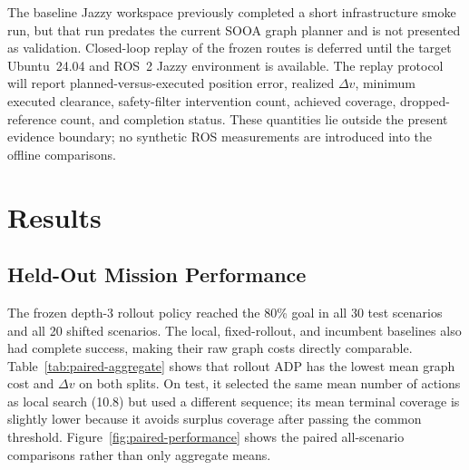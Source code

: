 \documentclass{IEEEtaes}
\theoremstyle{remark}
\theoremstyle{plain}
\begin{document}
The baseline Jazzy workspace previously completed a short infrastructure smoke run, but that run predates the current SOOA graph planner and is not presented as validation. Closed-loop replay of the frozen routes is deferred until the target Ubuntu~24.04 and ROS~2 Jazzy environment is available. The replay protocol will report planned-versus-executed position error, realized $\Delta v$, minimum executed clearance, safety-filter intervention count, achieved coverage, dropped-reference count, and completion status. These quantities lie outside the present evidence boundary; no synthetic ROS measurements are introduced into the offline comparisons.

\section{Results}
\label{sec:results}

\subsection{Held-Out Mission Performance}

The frozen depth-3 rollout policy reached the 80\% goal in all 30 test scenarios and all 20 shifted scenarios. The local, fixed-rollout, and incumbent baselines also had complete success, making their raw graph costs directly comparable. Table~\ref{tab:paired-aggregate} shows that rollout ADP has the lowest mean graph cost and $\Delta v$ on both splits. On test, it selected the same mean number of actions as local search (10.8) but used a different sequence; its mean terminal coverage is slightly lower because it avoids surplus coverage after passing the common threshold. Figure~\ref{fig:paired-performance} shows the paired all-scenario comparisons rather than only aggregate means.
\end{document}

